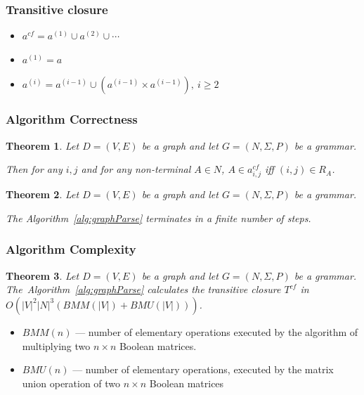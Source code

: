 \documentclass[xcolor=table]{beamer}
\newtheorem{mytheorem}{Theorem}
\begin{document}
\begin{frame}
  \transwipe[direction=90]
  \frametitle{Transitive closure}
  \begin{itemize}
    \item $a^{cf} = a^{(1)} \cup a^{(2)} \cup \cdots$
    \item $a^{(1)} = a$
    \item $a^{(i)} = a^{(i-1)} \cup (a^{(i-1)} \times a^{(i-1)}), ~i \ge 2$
  \end{itemize}
\end{frame}

\begin{frame}
  \transwipe[direction=90]
  \frametitle{Algorithm Correctness}
\begin{mytheorem}
 Let $D = (V,E)$ be a graph and let $G =(N,\Sigma,P)$ be a grammar. 
 
 Then for any $i, j$ and for any non-terminal $A \in N$, $A \in a^{cf}_{i,j}$ iff $(i,j) \in R_A$.
\end{mytheorem}


\begin{mytheorem}
 Let $D = (V,E)$ be a graph and let $G =(N,\Sigma,P)$ be a grammar. 
 
 The Algorithm~\ref{alg:graphParse} terminates in a finite number of steps. 
\end{mytheorem}
\end{frame}

\begin{frame}
  \transwipe[direction=90]
  \frametitle{Algorithm Complexity}
\begin{mytheorem}
 Let $D = (V,E)$ be a graph and let $G =(N,\Sigma,P)$ be a grammar. The~Algorithm~\ref{alg:graphParse} calculates the transitive closure $T^{cf}$ in $O(|V|^2|N|^3(BMM(|V|) + BMU(|V|)))$.
\end{mytheorem}

\begin{itemize}
  \item $BMM(n)$ --- number of elementary operations executed by the
algorithm of multiplying two $n \times n$ Boolean matrices.
  \item $BMU(n)$ --- number of elementary operations, executed by the matrix union
operation of two $n \times n$ Boolean matrices
\end{itemize}

\end{frame}
       
\end{document}
